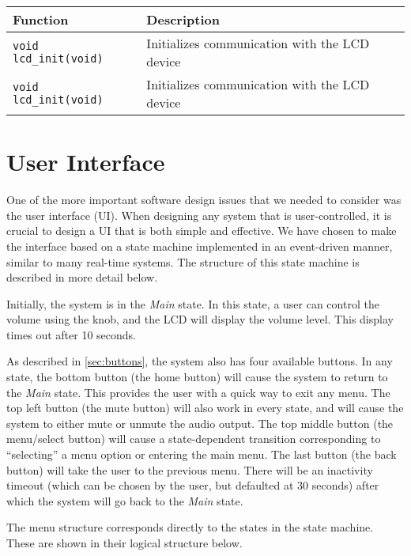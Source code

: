 \begin{center}
\begin{tabular}{l|l}
Function & Description \\
\hline
\texttt{void lcd\_init(void)} & Initializes communication with the LCD device \\
\hline
\texttt{void lcd\_init(void)} & Initializes communication with the LCD device \\
\end{tabular}
\end{center}

\section{User Interface}
\label{sec:ui}

One of the more important software design issues that we needed to consider was the user interface (UI). When designing any system that is user-controlled, it is crucial to design a UI that is both simple and effective. We have chosen to make the interface based on a state machine implemented in an event-driven manner, similar to many real-time systems. The structure of this state machine is described in more detail below.

Initially, the system is in the \emph{Main} state. In this state, a user can control the volume using the knob, and the LCD will display the volume level. This display times out after 10 seconds.

As described in \autoref{sec:buttons}, the system also has four available buttons. In any state, the bottom button (the home button) will cause the system to return to the \emph{Main} state. This provides the user with a quick way to exit any menu. The top left button (the mute button) will also work in every state, and will cause the system to either mute or unmute the audio output. The top middle button (the menu/select button) will cause a state-dependent transition corresponding to ``selecting'' a menu option or entering the main menu. The last button (the back button) will take the user to the previous menu. There will be an inactivity timeout (which can be chosen by the user, but defaulted at 30 seconds) after which the system will go back to the \emph{Main} state.

The menu structure corresponds directly to the states in the state machine. These are shown in their logical structure below.

